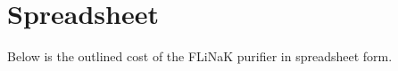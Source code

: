 
%
%

\label{chap: cost}

\section{Spreadsheet}

Below is the outlined cost of the FLiNaK purifier in spreadsheet form.
\par



